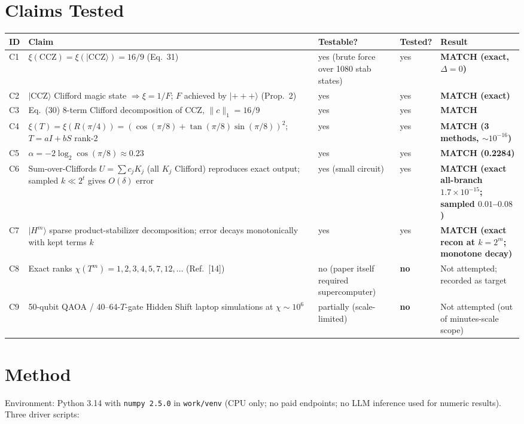 \documentclass[11pt]{article}
\begin{document}
\section{Claims Tested}

\begin{longtable}{p{0.4cm}p{6cm}p{2cm}p{2cm}p{3.3cm}}
\toprule
ID & Claim & Testable? & Tested? & Result \\
\midrule
C1 & $\xi(\mathrm{CCZ}) = \xi(|\mathrm{CCZ}\rangle) = 16/9$ (Eq.~31) & yes (brute force over 1080 stab states) & yes & \textbf{MATCH (exact, $\Delta=0$)} \\
C2 & $|\mathrm{CCZ}\rangle$ Clifford magic state $\Rightarrow \xi = 1/F$; $F$ achieved by $|{+}{+}{+}\rangle$ (Prop.~2) & yes & yes & \textbf{MATCH (exact)} \\
C3 & Eq.~(30) 8-term Clifford decomposition of CCZ, $\|c\|_1 = 16/9$ & yes & yes & \textbf{MATCH} \\
C4 & $\xi(T) = \xi(R(\pi/4)) = (\cos(\pi/8)+\tan(\pi/8)\sin(\pi/8))^2$; $T = aI + bS$ rank-2 & yes & yes & \textbf{MATCH (3 methods, $\sim 10^{-16}$)} \\
C5 & $\alpha = -2\log_2\cos(\pi/8) \approx 0.23$ & yes & yes & \textbf{MATCH (0.2284)} \\
C6 & Sum-over-Cliffords $U = \sum c_j K_j$ (all $K_j$ Clifford) reproduces exact output; sampled $k \ll 2^t$ gives $O(\delta)$ error & yes (small circuit) & yes & \textbf{MATCH (exact all-branch $1.7\!\times\!10^{-15}$; sampled $0.01$--$0.08$)} \\
C7 & $|H^m\rangle$ sparse product-stabilizer decomposition; error decays monotonically with kept terms $k$ & yes & yes & \textbf{MATCH (exact recon at $k=2^m$; monotone decay)} \\
C8 & Exact ranks $\chi(T^m) = 1,2,3,4,5,7,12,\ldots$ (Ref.~[14]) & no (paper itself required supercomputer) & \textbf{no} & Not attempted; recorded as target \\
C9 & 50-qubit QAOA / 40--64-$T$-gate Hidden Shift laptop simulations at $\chi \sim 10^6$ & partially (scale-limited) & \textbf{no} & Not attempted (out of minutes-scale scope) \\
\bottomrule
\end{longtable}

\section{Method}

Environment: Python 3.14 with \texttt{numpy 2.5.0} in \texttt{work/venv} (CPU only; no
paid endpoints; no LLM inference used for numeric results). Three driver scripts:
\end{document}
